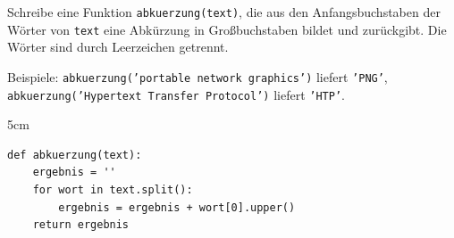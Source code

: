 \question[4]
Schreibe eine Funktion \texttt{abkuerzung(text)}, die aus den Anfangsbuchstaben der Wörter von \texttt{text}
eine Abkürzung in Großbuchstaben bildet und zurückgibt. Die Wörter sind durch Leerzeichen getrennt.

Beispiele: \texttt{abkuerzung('portable network graphics')} liefert \texttt{'PNG'}, \\
\texttt{abkuerzung('Hypertext Transfer Protocol')} liefert \texttt{'HTP'}.

\begin{solutionbox}{5cm}
\begin{lstlisting}
def abkuerzung(text):
    ergebnis = ''
    for wort in text.split():
        ergebnis = ergebnis + wort[0].upper()
    return ergebnis
\end{lstlisting}
\end{solutionbox}
